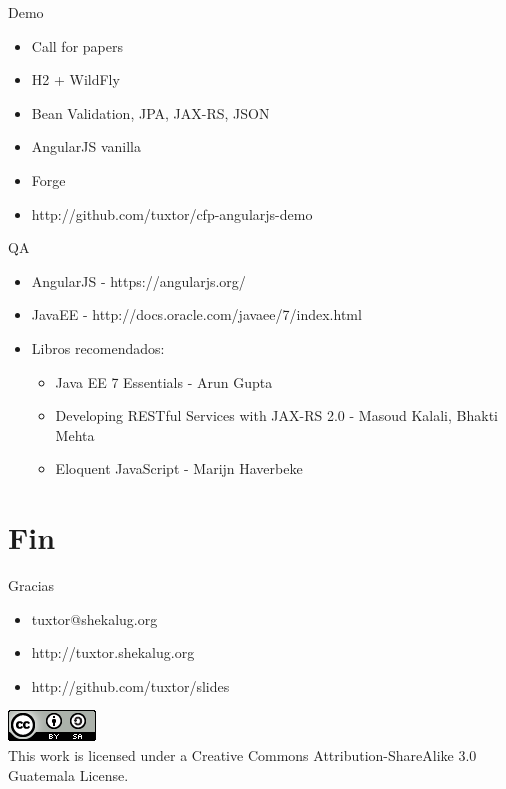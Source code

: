 \documentclass{beamer}
\begin{document}
\begin{frame}{Demo}
	\begin{itemize}
		\item Call for papers
		\item H2 + WildFly
		\item Bean Validation, JPA, JAX-RS, JSON
		\item AngularJS vanilla
		\item Forge
		\item http://github.com/tuxtor/cfp-angularjs-demo
	\end{itemize}
\end{frame}

\begin{frame}{QA}
	\begin{itemize}
		\item AngularJS - https://angularjs.org/
		\item JavaEE - http://docs.oracle.com/javaee/7/index.html
		\item Libros recomendados:
		\begin{itemize}
			\item Java EE 7 Essentials - Arun Gupta
			\item Developing RESTful Services with JAX-RS 2.0 - Masoud Kalali, Bhakti Mehta
			\item Eloquent JavaScript - Marijn Haverbeke
		\end{itemize}
	\end{itemize}
\end{frame}



\section{Fin}

\begin{frame}{Gracias}
\begin{itemize}
\item tuxtor@shekalug.org
\item http://tuxtor.shekalug.org
\item http://github.com/tuxtor/slides
\end{itemize}
\begin{center}
\includegraphics[width=0.1\linewidth]{Images/cclogo}
\\
This work is licensed under a Creative Commons Attribution-ShareAlike 3.0 Guatemala License.
\end{center}
\end{frame}
\end{document}
